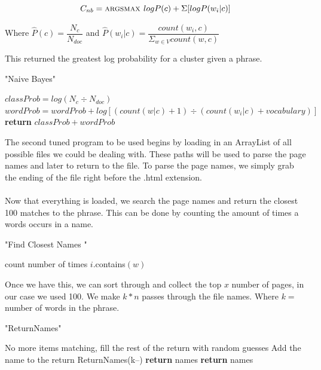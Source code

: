 \documentclass{article}
\begin{document}
$$C_{nb} = \textsc{argsmax  }logP(c) + \Sigma[logP(w_i|c)]$$
\begin{center}
Where $\hat{P}(c) = \dfrac{N_c}{N_{doc}}$
and $\hat{P}(w_i|c) = \dfrac{count(w_i,c)}{\Sigma_{w \in V} count(w,c)}$
\end{center}
This returned the greatest log probability for a cluster given a phrase.

\begin{algorithm}
\caption{"Naive Bayes"}
\begin{algorithmic}[Problem 1]
\State $classProb = log(N_c \div N_{doc})$
	\State $wordProb = wordProb +  log[(count(w|c) + 1) \div (count(w_i|c) + vocabulary)]$
\EndFor
\State \textbf{return}  $classProb + wordProb$
\end{algorithmic}
\end{algorithm}

The second tuned program to be used begins by loading in an ArrayList of all possible files we could be dealing with. These paths will be used to parse the page names and later to return to the file. To parse the page names, we simply grab the ending of the file right before the .html extension. 
\\\\
Now that everything is loaded, we search the page names and return the closest 100 matches to the phrase. This can be done by counting the amount of times a words occurs in a name. 

\begin{algorithm}
\caption{"Find Closest Names "}
\begin{algorithmic}[Problem 1]
		\State count number of times $i$.contains$(w)$
	\EndFor
\EndFor
\end{algorithmic}
\end{algorithm}

\noindent
Once we have this, we can sort through and collect the top $x$ number of pages, in our case we used 100. We make $k*n$ passes through the file names. Where $k = $ number of words in the phrase. 

\begin{algorithm}[H]
\caption{"ReturnNames"}
\begin{algorithmic}[Problem 1]
				\State No more items matching, fill the rest of the return with random guesses
			\EndIf
			\Else
				\State Add the name to the return
		\EndIf
			\State ReturnNames(k--)
		\EndIf
	\Else
		\State \textbf{return} names
	\EndIf
\EndFor
\State \textbf{return} names
\end{algorithmic}
\end{algorithm}
\end{document}
